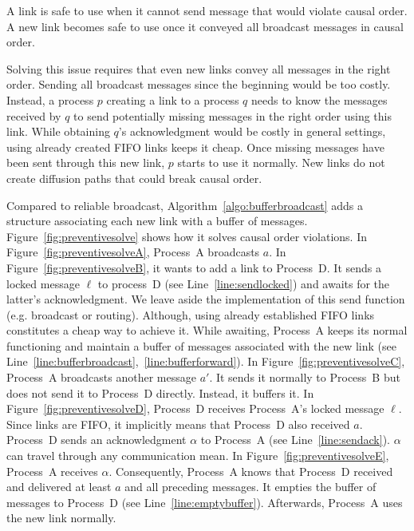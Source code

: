 A link is safe to use when it cannot send message that would violate causal
order. A new link becomes safe to use once it conveyed all broadcast messages in
causal order.

Solving this issue requires that even new links convey all messages in the right
order. Sending all broadcast messages since the beginning would be too
costly. Instead, a process $p$ creating a link to a process $q$ needs to know
the messages received by $q$ to send potentially missing messages in the right
order using this link. While obtaining $q$'s acknowledgment would be costly in
general settings, using already created FIFO links keeps it cheap. Once missing
messages have been sent through this new link, $p$ starts to use it
normally. New links do not create diffusion paths that could break causal order.

Compared to reliable broadcast, Algorithm~\ref{algo:bufferbroadcast} adds a
structure associating each new link with a buffer of
messages. Figure~\ref{fig:preventivesolve} shows how it solves causal order
violations. In Figure~\ref{fig:preventivesolveA}, Process~A broadcasts $a$.  In
Figure~\ref{fig:preventivesolveB}, it wants to add a link to Process~D. It sends
a locked message $\ell$ to process~D (see Line~\ref{line:sendlocked}) and awaits
for the latter's acknowledgment.  We leave aside the implementation of this send
function (e.g. broadcast or routing). Although, using already established FIFO
links constitutes a cheap way to achieve it. While awaiting, Process~A keeps its
normal functioning and maintain a buffer of messages associated with the new
link (see Line~\ref{line:bufferbroadcast},~\ref{line:bufferforward}). In
Figure~\ref{fig:preventivesolveC}, Process~A broadcasts another message $a'$. It
sends it normally to Process~B but does not send it to Process~D
directly. Instead, it buffers it. In Figure~\ref{fig:preventivesolveD},
Process~D receives Process~A's locked message $\ell$. Since links are FIFO, it
implicitly means that Process~D also received $a$. Process~D sends an
acknowledgment $\alpha$ to Process~A (see Line~\ref{line:sendack}). $\alpha$ can
travel through any communication mean. In Figure~\ref{fig:preventivesolveE},
Process~A receives $\alpha$. Consequently, Process~A knows that Process~D
received and delivered at least $a$ and all preceding messages. It empties the
buffer of messages to Process~D (see Line~\ref{line:emptybuffer}). Afterwards,
Process~A uses the new link normally.

